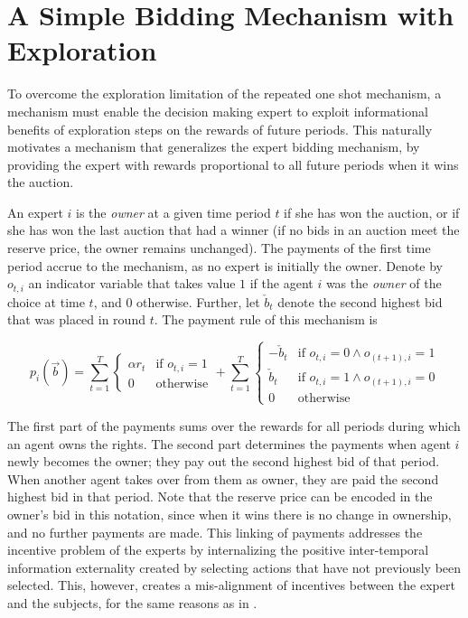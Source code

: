 \section{A Simple Bidding Mechanism with Exploration}

To overcome the exploration limitation of the repeated one shot mechanism, a mechanism must enable the decision making expert to exploit informational benefits of exploration steps on the rewards of future periods.
This naturally motivates a mechanism that generalizes the expert bidding mechanism, by providing the expert with rewards proportional to all future periods when it wins the auction.

\begin{mech}
An expert $i$ is the \emph{owner} at a given time period $t$ if she has won the auction, or if she has won the last auction that had a winner (if no bids in an auction meet the reserve price, the owner remains unchanged). 
The payments of the first time period accrue to the mechanism, as no expert is initially the owner.
   Denote by $o_{t,i}$ an indicator variable that takes value $1$ if the agent $i$ was the \emph{owner} of the choice at time $t$, and $0$ otherwise. Further, let $\check b_{t}$ denote the second highest bid that was placed in round $t$. The payment rule of this mechanism is

\[
   p_i(\vec b) =  \sum_{t=1}^T
\begin{cases}
    \alpha r_{t} & \text{if } o_{t,i} = 1\\
    0              & \text{otherwise}
\end{cases}
+
   \sum_{t=1}^T
\begin{cases}
     - \check b_{t} & \text{if } o_{t,i} = 0 \land o_{(t+1),i} = 1\\
      \check b_{t} & \text{if } o_{t,i}= 1 \land o_{(t+1),i} = 0 \\
		0              & \text{otherwise}
\end{cases}
\]

\end{mech}


The first part of the payments sums over the rewards for all periods during which an agent owns the rights.
The second part determines the payments when agent $i$ newly becomes the owner; they pay out the second highest bid of that period. 
When another agent takes over from them as owner, they are paid the second highest bid in that period.
Note that the reserve price can be encoded in the owner's bid in this notation, since when it wins there is no change in ownership, and no further payments are made. 
This linking of payments addresses the incentive problem of the experts by internalizing the positive inter-temporal information externality created by selecting actions that have not previously been selected.
This, however, creates a mis-alignment of incentives between the expert and the subjects, for the same reasons as in \citet{mansour2015bayesian}. 


